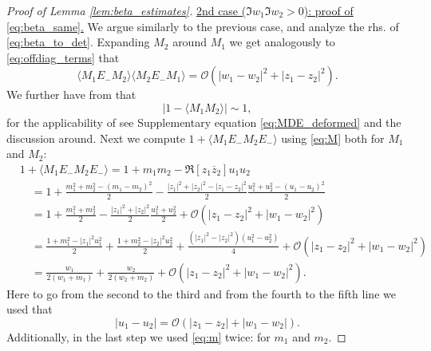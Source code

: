 \documentclass[10pt]{amsart}
\numberwithin{equation}{section}
\begin{document}
\begin{proof}[Proof of Lemma \ref{lem:beta_estimates}]
\medskip

\noindent\underline{2nd case ($\Im w_1\Im w_2>0$): proof of \eqref{eq:beta_same}.} We argue similarly to the previous case, and analyze the rhs. of \eqref{eq:beta_to_det}. Expanding $M_2$ around $M_1$ we get analogously to \eqref{eq:offdiag_terms} that
\begin{equation}
\langle M_1E_-M_2\rangle \langle M_2E_-M_1\rangle = \mathcal{O}\left(|w_1-w_2|^2 + |z_1-z_2|^2\right).
\label{eq:offdiag_terms_same}
\end{equation}
We further have from \cite[Eq.(3.4)]{eigenv_decorr} that
\begin{equation}
|1-\langle M_1M_2\rangle|\sim 1,
\label{eq:same_stab}
\end{equation}
for the applicability of \cite{eigenv_decorr} see Supplementary equation \eqref{eq:MDE_deformed} and the discussion around. Next we compute $1+\langle M_1E_-M_2E_-\rangle$ using \eqref{eq:M} both for $M_1$ and $M_2$:
\begin{equation}
\begin{split}
&1+\langle M_1E_-M_2E_-\rangle = 1 +m_1m_2-\Re [z_1\overline{z}_2]u_1u_2\\
&\quad = 1+ \frac{m_1^2 + m_2^2 - (m_1-m_2)^2}{2} - \frac{|z_1|^2 +|z_2|^2 - |z_1-z_2|^2}{2}\frac{u_1^2 +u_2^2-(u_1-u_2)^2}{2}\\
&\quad=1+\frac{m_1^2+m_2^2}{2} - \frac{|z_1|^2+|z_2|^2}{2}\frac{u_1^2+u_2^2}{2} +\mathcal{O}(|z_1-z_2|^2 +|w_1-w_2|^2)\\
&\quad=\frac{1+m_1^2 -|z_1|^2u_1^2}{2}+\frac{1+m_2^2 -|z_2|^2u_2^2}{2} + \frac{(|z_1|^2-|z_2|^2)(u_1^2-u_2^2)}{4} + \mathcal{O}(|z_1-z_2|^2 +|w_1-w_2|^2)\\
&\quad= \frac{w_1}{2(w_1+m_1)}+\frac{w_2}{2(w_2+m_2)} + \mathcal{O}(|z_1-z_2|^2 +|w_1-w_2|^2).
\end{split}
\label{eq:MEM_new}
\end{equation}
Here to go from the second to the third and from the fourth to the fifth line we used that
\begin{equation*}
|u_1-u_2|=\mathcal{O}(|z_1-z_2| +|w_1-w_2|).
\end{equation*}
Additionally, in the last step we used \eqref{eq:m} twice: for $m_1$ and $m_2$. 


\end{proof}
\end{document}
